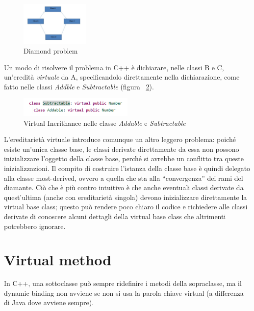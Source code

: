 \begin{figure}[h]
	\centering
	\includegraphics[width=0.3\textwidth]{Immagini/DiamondProblem.png}
	\caption{Diamond problem}
	\label{fig:DiamondProblem}
\end{figure}

Un modo di risolvere il problema in C++ è dichiarare, nelle classi B e C, un'eredità \textit{virtuale} da A, specificandolo direttamente nella dichiarazione, come fatto nelle classi \textit{Addble} e \textit{Subtractable} (figura ~\ref{fig:VirtualInerithance}).

\begin{figure}[h]
	\centering
	\includegraphics[width=0.5\textwidth]{Immagini/VirtualInerithance.png}
	\caption{Virtual Inerithance nelle classe \textit{Addable} e \textit{Subtractable}}
	\label{fig:VirtualInerithance}
\end{figure}


L’ereditarietà virtuale introduce comunque un altro leggero problema: poiché esiste un’unica
classe base, le classi derivate direttamente da essa non possono inizializzare l’oggetto della
classe base, perché si avrebbe un conflitto tra queste inizializzazioni. Il compito di costruire
l’istanza della classe base è quindi delegato alla classe most-derived, ovvero a quella che sta
alla “convergenza” dei rami del diamante. Ciò che è più contro intuitivo è che anche eventuali
classi derivate da quest’ultima (anche con ereditarietà singola) devono inizializzare
direttamente la virtual base class; questo può rendere poco chiaro il codice e richiedere alle
classi derivate di conoscere alcuni dettagli della virtual base class che altrimenti potrebbero
ignorare.

\section{Virtual method}
In C++, una sottoclasse può sempre ridefinire i metodi della sopraclasse, ma il dynamic binding non
avviene se non si usa la parola chiave virtual (a differenza di Java dove avviene sempre).

